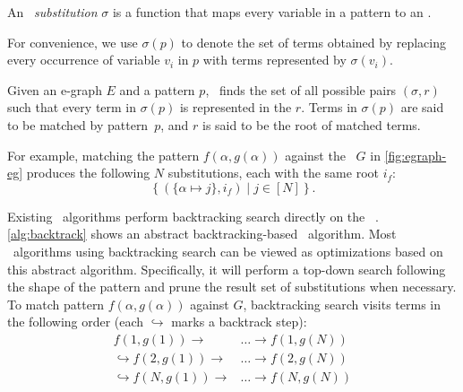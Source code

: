 \begin{definition}
  An \textit{\ematching~substitution} $\sigma$ is a function that maps
every variable in a pattern to an \eclass.  
\end{definition}
 For convenience, we use $\sigma(p)$ to
denote the set of terms obtained by replacing every occurrence of variable $v_i$
in $p$ with terms represented by $\sigma(v_i)$.

\begin{definition}
  Given an e-graph $E$ and a pattern $p$,
\ematching~finds the set of all possible pairs $(\sigma, r)$ such that every
term in $\sigma(p)$ is represented in the \eclass $r$. Terms in $\sigma(p)$ are
said to be matched by pattern~$p$, and $r$ is said to be the root of matched terms.  
\end{definition}
For example, matching the pattern $f(\alpha, g(\alpha))$ against the \egraph~$G$
in \autoref{fig:egraph-eg} produces the following $N$ substitutions,
 each with the same root $i_f$:
\[
  \left\{
    (\{\alpha \mapsto j\}, i_f) \mid j \in [N]
  \right\}.
\]

Existing \ematching~algorithms perform backtracking search directly on the
\egraph~\cite{efficient-ematching,simplify,egg}.
\autoref{alg:backtrack} shows
 an abstract backtracking-based
 \ematching~algorithm.
Most
\ematching~algorithms using backtracking search can be viewed as
optimizations based on this abstract algorithm. Specifically,
it will perform a top-down search following the shape of the pattern and prune
the result set of substitutions when necessary.
To match pattern $f(\alpha,
g(\alpha))$ against $G$, backtracking search visits terms in the following order
(each $\hookrightarrow$ marks a backtrack step):
\begin{align*}
  f(1, g(1)) \rightarrow & \dots \rightarrow f(1, g(N)) \\
    \hookrightarrow f(2, g(1))\rightarrow & \dots \rightarrow f(2, g(N)) \\
    \hookrightarrow f(N, g(1))\rightarrow & \dots \rightarrow f(N, g(N))
\end{align*}

